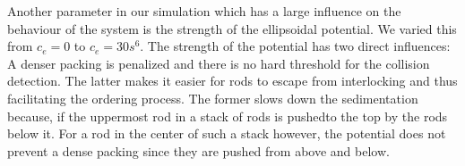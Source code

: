 Another parameter in our simulation which has a large influence on the behaviour of the system is the strength of the ellipsoidal potential. We varied this from $c_e =0$ to $c_e=30s^6$. The strength of the potential has two direct influences: A denser packing is penalized and  there is no hard threshold for the collision detection. The latter makes it easier for rods to escape from interlocking and thus facilitating the ordering process. The former slows down the sedimentation because, if the uppermost rod in  a stack of rods is pushedto the top by the rods below it. For a rod in the center of such a stack however, the potential does not prevent a dense packing since they are pushed from above and below.   
